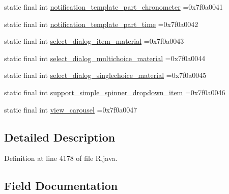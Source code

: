 \begin{DoxyCompactItemize}
\item 
static final int \mbox{\hyperlink{classcom_1_1example_1_1trainawearapplication_1_1_r_1_1layout_ac8b8fced1207e293669d567dbc50b7a5}{notification\+\_\+template\+\_\+part\+\_\+chronometer}} =0x7f0a0041
\item 
static final int \mbox{\hyperlink{classcom_1_1example_1_1trainawearapplication_1_1_r_1_1layout_a83d0abe0cb4306cf1291fc209c5efcd0}{notification\+\_\+template\+\_\+part\+\_\+time}} =0x7f0a0042
\item 
static final int \mbox{\hyperlink{classcom_1_1example_1_1trainawearapplication_1_1_r_1_1layout_aa320483df1d4c8b348eb70e205e3eef7}{select\+\_\+dialog\+\_\+item\+\_\+material}} =0x7f0a0043
\item 
static final int \mbox{\hyperlink{classcom_1_1example_1_1trainawearapplication_1_1_r_1_1layout_a2371087ea57d7bb00f572c1c3e436931}{select\+\_\+dialog\+\_\+multichoice\+\_\+material}} =0x7f0a0044
\item 
static final int \mbox{\hyperlink{classcom_1_1example_1_1trainawearapplication_1_1_r_1_1layout_a7627206dd4b711c18f28ad1ce46d0455}{select\+\_\+dialog\+\_\+singlechoice\+\_\+material}} =0x7f0a0045
\item 
static final int \mbox{\hyperlink{classcom_1_1example_1_1trainawearapplication_1_1_r_1_1layout_a4bfe41483221a76a61ceb29c5b586e74}{support\+\_\+simple\+\_\+spinner\+\_\+dropdown\+\_\+item}} =0x7f0a0046
\item 
static final int \mbox{\hyperlink{classcom_1_1example_1_1trainawearapplication_1_1_r_1_1layout_aabf14a74425ec5b01a6a16fb4ed9dcab}{view\+\_\+carousel}} =0x7f0a0047
\end{DoxyCompactItemize}


\subsection{Detailed Description}


Definition at line 4178 of file R.\+java.



\subsection{Field Documentation}
\mbox{\label{classcom_1_1example_1_1trainawearapplication_1_1_r_1_1layout_a2e2d17438659ec80939e8cbe284b3098}} 

